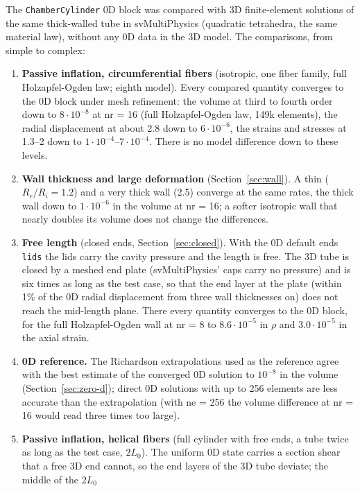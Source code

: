 The \texttt{ChamberCylinder} 0D block was compared with 3D finite-element solutions of the
same thick-walled tube in svMultiPhysics (quadratic tetrahedra, the same material law),
without any 0D data in the 3D model. The comparisons, from simple to complex:

\begin{enumerate}
\item \textbf{Passive inflation, circumferential fibers} (isotropic, one fiber family, full
Holzapfel-Ogden law; eighth model). Every compared quantity converges to the 0D block
under mesh refinement: the volume at third to fourth order down to $8\cdot10^{-8}$ at
nr = 16 (full Holzapfel-Ogden law, 149k elements), the radial displacement at about 2.8
down to $6\cdot10^{-6}$, the strains and stresses at 1.3--2 down to $1\cdot10^{-4}$--$7\cdot10^{-4}$.
There is no model difference down to these levels.
\item \textbf{Wall thickness and large deformation} (Section~\ref{sec:wall}). A thin
($R_e/R_i = 1.2$) and a very thick wall (2.5) converge at the same rates, the thick wall
down to $1\cdot10^{-6}$ in the volume at nr = 16; a softer isotropic wall that nearly
doubles its volume does not change the differences.
\item \textbf{Free length} (closed ends, Section~\ref{sec:closed}). With the 0D default
ends \texttt{lids} the lids carry the cavity pressure and the length is free. The
3D tube is closed by a meshed end plate (svMultiPhysics' caps carry no pressure) and is
six times as long as the test case, so that the end layer at the plate (within 1\% of the
0D radial displacement from three wall thicknesses on) does not reach the mid-length plane. There every
quantity converges to the 0D block, for the full Holzapfel-Ogden wall at nr = 8 to
$8.6\cdot10^{-5}$ in $\rho$ and $3.0\cdot10^{-5}$ in the axial strain.
\item \textbf{0D reference.} The Richardson extrapolations used as the reference agree with
the best estimate of the converged 0D solution to $10^{-8}$ in the volume (Section~\ref{sec:zero-d});
direct 0D solutions with up to 256 elements are less accurate than the extrapolation (with
ne = 256 the volume difference at nr = 16 would read three times too large).
\item \textbf{Passive inflation, helical fibers} (full cylinder with free ends, a tube
twice as long as the test case, $2L_0$). The uniform 0D state carries a section shear that
a free 3D end cannot, so the end layers of the 3D tube deviate; the middle of the $2L_0$

\end{enumerate}
